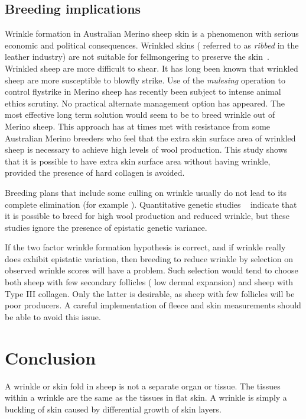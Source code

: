 \documentclass[]{interact}
\theoremstyle{plain}%
\theoremstyle{definition}
\theoremstyle{remark}
\begin{document}
\subsection{Breeding implications}
Wrinkle formation in Australian Merino sheep skin is a phenomenon with serious economic and political consequences. Wrinkled skins ( referred to as {\em ribbed} in the leather industry) are not suitable for fellmongering to preserve the skin~\citep{scobie-2005a}. Wrinkled sheep are more difficult to shear.  It has long been known \citep{seddon-1931} that wrinkled sheep are more susceptible to blowfly strike. Use of the {\em mulesing} operation to control flystrike in Merino sheep has recently been subject to intense animal ethics scrutiny. No practical alternate management option has appeared.
The most effective long term solution would seem to be to breed wrinkle out of Merino sheep. This approach has at times met with resistance from some Australian Merino breeders who feel that the extra skin surface area of wrinkled sheep is necessary to achieve high levels of wool production.  This study shows that it is possible to have extra skin surface area without having wrinkle, provided the presence of hard collagen is avoided.

Breeding plans that include some culling on wrinkle usually do not lead to its complete elimination (for example \citep{turner-1968}). Quantitative genetic studies ~\citep{hatcher-2012} indicate that it is possible to breed for high wool production and reduced wrinkle, but these studies ignore the presence of epistatic genetic variance.

If the two factor wrinkle formation hypothesis is correct, and if wrinkle really does exhibit epistatic variation, then breeding to reduce wrinkle by selection on observed wrinkle scores will have a problem. Such selection would tend to choose both sheep with few secondary follicles ( low dermal expansion) and sheep with Type III collagen. Only the latter is desirable, as sheep with few follicles will be poor producers. A careful implementation of fleece and skin measurements should be able to avoid this issue.


\section{Conclusion}
 A wrinkle or skin fold in sheep is not a separate organ or tissue. The tissues within a wrinkle are the same as the tissues in flat skin. A wrinkle is simply a buckling of skin caused by differential growth of skin layers.
\end{document}
